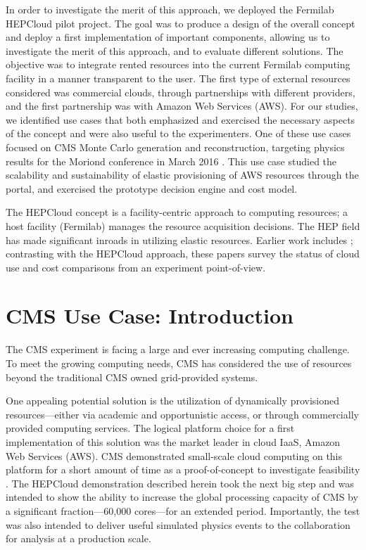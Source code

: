 \documentclass[twocolumn]{svjour3}          %
\begin{document}
In order to investigate the merit of this approach, we deployed the Fermilab HEPCloud pilot project. The goal was to produce a design of the overall concept and deploy a first
implementation of important components, allowing us to investigate the merit of this approach, and to evaluate different solutions. 
The objective was to integrate rented resources into the current Fermilab computing facility in a manner transparent to the user.  The first type of external resources considered was commercial clouds, through partnerships with different providers, and the first partnership was with Amazon Web Services (AWS). For our studies, we identified use cases that both emphasized and exercised the necessary aspects of the concept and were also useful to the experimenters. One of these use cases focused on CMS Monte Carlo generation and reconstruction, targeting physics results for the Moriond conference in March 2016 \cite{MoriondQCD16,MoriondEW16,cmsresults}. This use case studied the scalability and sustainability of elastic provisioning of AWS resources through the portal, and exercised the prototype decision engine and cost model.

The HEPCloud concept is a facility-centric approach to computing resources; a host facility (Fermilab) manages the resource acquisition decisions.  The HEP field has made significant inroads in utilizing elastic resources.  Earlier work includes \cite{atlas_cloud,atlas_cloud2,belle_cloud,cms_cloud}; contrasting with the HEPCloud approach, these papers survey the status of cloud use and cost comparisons from an experiment point-of-view.

\section{CMS Use Case: Introduction}

The CMS experiment is facing a large and ever increasing computing challenge. To meet the growing computing needs, CMS has considered the use of resources beyond the traditional CMS owned grid-provided systems.

One appealing potential solution is the utilization of dynamically provisioned resources---either via academic and opportunistic access, or through commercially provided computing services.  The logical
platform choice for a first implementation of this solution was the market leader \cite{Gartner_2015} in cloud IaaS, Amazon Web Services (AWS).
CMS demonstrated small-scale cloud computing on this platform for a short amount of time as a proof-of-concept to investigate feasibility \cite{gwms_cloud,evans11}.
The HEPCloud demonstration described herein
took the next big step and was intended to show the ability to increase the global processing capacity of CMS by a significant fraction---60,000 cores---for an extended period. Importantly, the test was also intended to deliver useful simulated physics events to the collaboration for analysis at a production scale.
\end{document}
